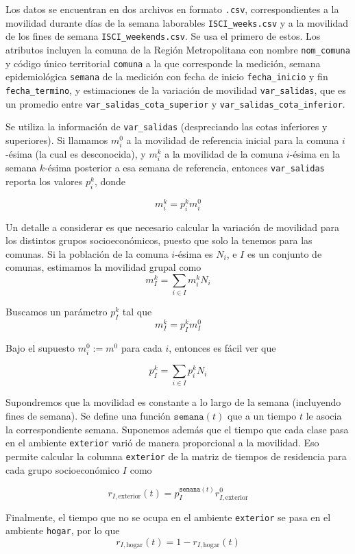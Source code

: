 Los datos se encuentran en dos archivos en formato \texttt{.csv}, correspondientes a la movilidad durante días de la semana laborables \texttt{ISCI\_weeks.csv} y a la movilidad de los fines de semana \texttt{ISCI\_weekends.csv}. Se usa el primero de estos. Los atributos incluyen la comuna de la Región Metropolitana con nombre \texttt{nom\_comuna} y código único territorial \texttt{comuna} a la que corresponde la medición, semana epidemiológica \texttt{semana} de la medición con fecha de inicio \texttt{fecha\_inicio} y fin \texttt{fecha\_termino}, y estimaciones de la variación de movilidad \texttt{var\_salidas}, que es un promedio entre \texttt{var\_salidas\_cota\_superior} y \texttt{var\_salidas\_cota\_inferior}. 

Se utiliza la información de \texttt{var\_salidas} (despreciando las cotas inferiores y superiores). Si llamamos \(m_i^0\) a la movilidad de referencia inicial para la comuna \(i\)-ésima (la cual es desconocida), y \(m_i^k\) a la movilidad de la comuna \(i\)-ésima en la semana \(k\)-ésima posterior a esa semana de referencia, entonces \texttt{var\_salidas} reporta los valores \(p_i^k\), donde 

\[
m_i^k = p_i^k m_i^0
\]

Un detalle a considerar es que necesario calcular la variación de movilidad para los distintos grupos socioeconómicos, puesto que solo la tenemos para las comunas. Si la población de la comuna \(i\)-ésima es \(N_i\), e \(I\) es un conjunto de comunas, estimamos la movilidad grupal como 
\[
m^k_I = \sum_{i \in I}m^k_i N_i
\]

Buscamos un parámetro \(p_I^k\) tal que 
\[
m_I^k = p_I^k m_I^0
\]

Bajo el supuesto \(m_i^0 := m^0\) para cada \(i\), entonces es fácil ver que

\[
p_I^k = \sum_{i \in I} p_i^k N_i
\]

Supondremos que la movilidad es constante a lo largo de la semana (incluyendo fines de semana). Se define una función \(\mathtt{semana}(t)\) que a un tiempo \(t\) le asocia la correspondiente semana. Suponemos además que el tiempo que cada clase pasa en el ambiente \texttt{exterior} varió de manera proporcional a la movilidad. Eso permite calcular la columna \texttt{exterior} de la matriz de tiempos de residencia para cada grupo socioeconómico \(I\) como

\[
r_{I, \text{exterior}}(t) = p_I^{\mathtt{semana}(t)} r_{I,\text{exterior}}^0
\]





Finalmente, el tiempo que no se ocupa en el ambiente \texttt{exterior} se pasa en el ambiente \texttt{hogar}, por lo que 
\[
r_{I, \text{hogar}}(t) = 1 - r_{I,\text{hogar}}(t)
\]